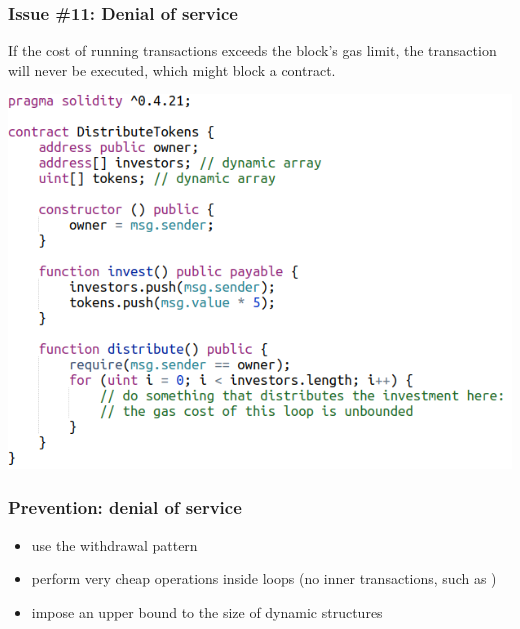 \documentclass[11pt]{beamer}  %
\def\codesize{\smaller}
\def\<#1>{\codeid{#1}}
\newcommand{\codeid}[1]{\ifmmode{\mbox{\codesize\ttfamily{#1}}}\else{\codesize\ttfamily #1}\fi}
\begin{document}
\begin{frame}\frametitle{Issue \#11: Denial of service}

  \begin{redbox}{}
    If the cost of running transactions exceeds the block's gas limit, the
    transaction will never be executed, which might block a contract.
  \end{redbox}

  \begin{center}
    \includegraphics[scale=0.35,clip=false]{pictures/distribute-tokens.png}
  \end{center}

\end{frame}

\begin{frame}\frametitle{Prevention: denial of service}
  \begin{itemize}
  \item use the withdrawal pattern
  \item perform very cheap operations inside loops (no inner transactions, such as \<send>)
  \item impose an upper bound to the size of dynamic structures
  \end{itemize}
\end{frame}
\end{document}
